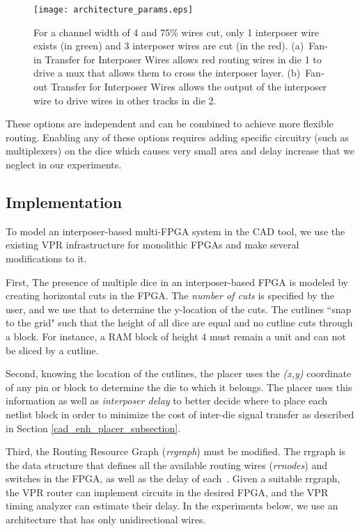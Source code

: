 \documentclass[journal]{IEEEtran}
\begin{document}
\begin{figure}[!htbp]
\centering
\texttt{[image: architecture\_params.eps]}
\caption{For a channel width of 4 and 75\% wires cut, only 1 interposer wire exists (in green) and 3 interposer wires are cut (in the red). (a)~Fan-in Transfer for Interposer Wires allows red routing wires in die 1  to drive a mux that allows them to cross the interposer layer. (b)~Fan-out Transfer for Interposer Wires allows the output of the interposer wire to drive wires in other tracks in die 2.}
\label{fig:architecture_params}
\end{figure}

These options are independent and can be combined to achieve more flexible routing. Enabling any of these options requires adding specific circuitry (such as multiplexers) on the dice which causes very small area and delay increase that we neglect in our experiments.

\subsection{Implementation}
To model an interposer-based multi-FPGA system in the CAD tool, we use the existing VPR infrastructure for monolithic FPGAs and make several modifications to it.

First, The presence of multiple dice in an interposer-based FPGA is modeled by creating horizontal cuts in the FPGA. The \textit{number of cuts} is specified by the user, and we use that to determine the y-location of the cuts. The cutlines ``snap to the grid" such that the height of all dice are equal and no cutline cuts through a block. For instance, a RAM block of height 4 must remain a unit and can not be sliced by a cutline.

Second, knowing the location of the cutlines, the placer uses the \textit{(x,y)} coordinate of any pin or block to determine the die to which it belongs. The placer uses this information as well as \textit{interposer delay} to better decide where to place each netlist block in order to minimize the cost of inter-die signal transfer as described in Section \ref{cad_enh_placer_subsection}.

Third, the Routing Resource Graph (\textit{rrgraph}) must be modified. The rrgraph is the data structure that defines all the available routing wires (\textit{rrnodes}) and switches in the FPGA, as well as the delay of each~\cite{betz1999architecture}. Given a suitable rrgraph, the VPR router can implement circuits in the desired FPGA, and the VPR timing analyzer can estimate their delay. In the experiments below, we use an architecture that has only unidirectional wires.
\end{document}
